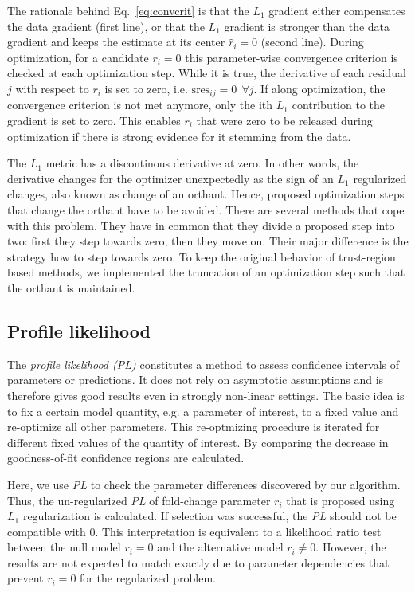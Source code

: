 \documentclass{bioinfo}
\begin{document}
The rationale behind Eq.~\ref{eq:convcrit} is that the $L_1$ gradient either compensates the data gradient (first line), or that the $L_1$ gradient is stronger than the data gradient and keeps the estimate at its center $\hat r_i=0$ (second line).
During optimization, for a candidate $r_i=0$ this parameter-wise convergence criterion is checked at each optimization step.
While it is true, the derivative of each residual $j$ with respect to $r_i$ is set to zero, i.e. $\text{sres}_{ij}=0\:\:\forall j$.
If along optimization, the convergence criterion is not met anymore, only the ith $L_1$ contribution to the gradient is set to zero.
This enables $r_i$ that were zero to be released during optimization if there is strong evidence for it stemming from the data.

The $L_1$ metric has a discontinous derivative at zero.
In other words, the derivative changes for the optimizer unexpectedly as the sign of an $L_1$ regularized changes, also known as change of an orthant.
Hence, proposed optimization steps that change the orthant have to be avoided.
There are several methods that cope with this problem.
They have in common that they divide a proposed step into two:
first they step towards zero, then they move on.
Their major difference is the strategy how to step towards zero.
To keep the original behavior of trust-region based methods, we implemented the truncation of an optimization step such that the orthant is maintained.

\subsection{Profile likelihood}
The \emph{profile likelihood (PL)} constitutes a method to assess confidence intervals of parameters or predictions.
It does not rely on asymptotic assumptions and is therefore gives good results even in strongly non-linear settings.
The basic idea is to fix a certain model quantity, e.g. a parameter of interest, to a fixed value and re-optimize all other parameters. %
This re-optmizing procedure is iterated for different fixed values of the quantity of interest.
By comparing the decrease in goodness-of-fit confidence regions are calculated.

Here, we use \emph{PL} to check the parameter differences discovered by our algorithm.
Thus, the un-regularized \emph{PL} of fold-change parameter $r_i$ that is proposed using $L_1$ regularization is calculated.
If selection was successful, the \emph{PL} should not be compatible with 0.
This interpretation is equivalent to a likelihood ratio test between the null model $r_i=0$ and the alternative model $r_i \neq 0$.
However, the results are not expected to match exactly due to parameter dependencies that prevent $r_i=0$ for the regularized problem.
\end{document}
